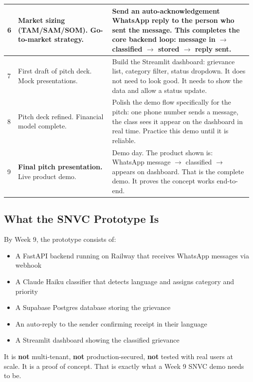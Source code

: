 \documentclass[12pt, a4paper]{article}
\begin{document}
\begin{table}[ht]
\begin{tabularx}{\textwidth}{p{1.3cm} p{3.5cm} X}
\midrule
\rowcolor{lightpurple!40}
6 & Market sizing (TAM/SAM/SOM). Go-to-market strategy. & Send an auto-acknowledgement WhatsApp reply to the person who sent the message. This completes the core backend loop: message in $\to$ classified $\to$ stored $\to$ reply sent. \\
\midrule
\rowcolor{lightpurple!40}
7 & First draft of pitch deck. Mock presentations. & Build the Streamlit dashboard: grievance list, category filter, status dropdown. It does not need to look good. It needs to show the data and allow a status update. \\
\midrule
\rowcolor{lightpurple!40}
8 & Pitch deck refined. Financial model complete. & Polish the demo flow specifically for the pitch: one phone number sends a message, the class sees it appear on the dashboard in real time. Practice this demo until it is reliable. \\
\midrule
\rowcolor{lightpurple!40}
9 & \textbf{Final pitch presentation.} Live product demo. & Demo day. The product shown is: WhatsApp message $\to$ classified $\to$ appears on dashboard. That is the complete demo. It proves the concept works end-to-end. \\
\bottomrule
\end{tabularx}
\end{table}

\subsection{What the SNVC Prototype Is}

By Week 9, the prototype consists of:

\begin{itemize}[leftmargin=1.5em, itemsep=0.3em]
    \item A FastAPI backend running on Railway that receives WhatsApp messages via webhook
    \item A Claude Haiku classifier that detects language and assigns category and priority
    \item A Supabase Postgres database storing the grievance
    \item An auto-reply to the sender confirming receipt in their language
    \item A Streamlit dashboard showing the classified grievance
\end{itemize}

It is \textbf{not} multi-tenant, \textbf{not} production-secured, \textbf{not} tested with
real users at scale. It is a proof of concept. That is exactly what a Week 9 SNVC
demo needs to be.
\end{document}
